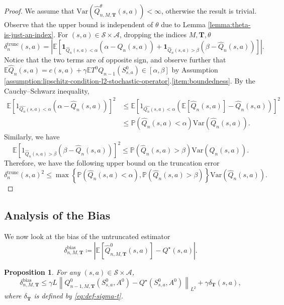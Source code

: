 \documentclass[11pt]{article}
\numberwithin{equation}{section}
\newtheorem{proposition}[theorem]{Proposition}
\theoremstyle{definition}
\theoremstyle{remark}
\begin{document}
\begin{proof}
    We assume that $\mathrm{Var}(\hat{Q}^\theta_{n,M, \mathbf T}(s,a)) < \infty$, otherwise the result is trivial. Observe that the upper bound is independent of $\theta$ due to Lemma \ref{lemma:theta-is-just-an-index}. For \((s,a) \in \mathcal S \times \mathcal A\), dropping the indices \(M,\mathbf T, \theta\)
    \[
        \delta^{\mathrm{trunc}}_n(s,a) = \left| \mathbb E \left[ \mathbf 1 _{\hat{Q}_n(s,a) < \alpha} \left(\alpha - \hat{Q}_n(s,a)\right)  + \mathbf 1 _{\hat{Q}_n(s,a) > \beta}\left(\beta - \hat{Q}_n(s,a)\right)\right] \right|.
    \]
    Notice that the two terms are of opposite sign, and observe further that $\mathbb E \hat Q_n(s,a) = c(s,a) + \gamma\mathbb E T^0  Q_{n - 1}(S^0_{s,a}) \in [\alpha, \beta]$ by Assumption \ref{assumption:lipschitz-condition-l2-stochastic-operator}.\ref{item:boundedness}.
   By the Cauchy--Schwarz inequality,
    \begin{align*}
        \mathbb E \left[ 1 _{\hat{Q_n}(s,a) < \alpha} \left(\alpha - \hat{Q}_n(s,a)\right) \right]^2 & \leq   \mathbb E \left[ 1 _{\hat{Q_n}(s,a) < \alpha} \left(\mathbb E \left[\hat Q_n(s,a)\right] - \hat{Q}_n(s,a)\right) \right]^2 \\
        & \leq \mathbb P \left(\hat{Q}_n(s,a) < \alpha \right) \mathrm{Var}\left(\hat{Q}_n(s,a)\right).
    \end{align*}
    Similarly, we have
    \[
        \mathbb E \left[1 _{\hat{Q}_n(s,a) > \beta}\left(\beta - \hat{Q}_n(s,a)\right) \right]^2 \leq \mathbb P \left(\hat Q_n (s,a) > \beta \right)\mathrm{Var} \left(\hat{Q}_n(s,a)\right).
    \]
    Therefore, we have the following upper bound on the truncation error
    \[
        \delta^{\mathrm{trunc}}_{n}(s,a)^2 \leq \max \left\{ \mathbb P \left(\hat{Q}_n(s,a) < \alpha \right), \mathbb P \left(\hat Q_n (s,a) > \beta \right)\right\} \mathrm{Var}\left(\hat{Q}_n(s,a)\right).
    \]
\end{proof}
\subsection{Analysis of the Bias}
\label{subsection:analysis-bias}
We now look at the bias of the untruncated estimator
\[
    \delta ^{\mathrm{bias}}_{n,M, \mathbf T} \coloneqq \left| \mathbb E \left[\hat{Q} ^{0} _{n,M,\mathbf T}(s,a)\right] - Q ^{\star}(s,a) \right|.
\]
\begin{proposition}
    \label{lemma:bias-upper-bound}
    For any $(s,a) \in \mathcal S \times \mathcal A$,
    \begin{equation*}
        \label{eq:bias-upper-bound}
        \delta ^{\mathrm{bias}}_{n,M, \mathbf T} \leq \gamma L  \left\| Q^0_{n-1,M,\mathbf T} \left(S^0_{s,a}, A^{0} \right) - Q^\star \left(S^0_{s,a}, A^{0}\right) \right\|_{L^2} + \gamma \delta_{\mathbf T}(s,a),
    \end{equation*}
    where $\delta_{\mathbf T}$ is defined by \eqref{eq:def-sigma-t}.
\end{proposition}
\end{document}
